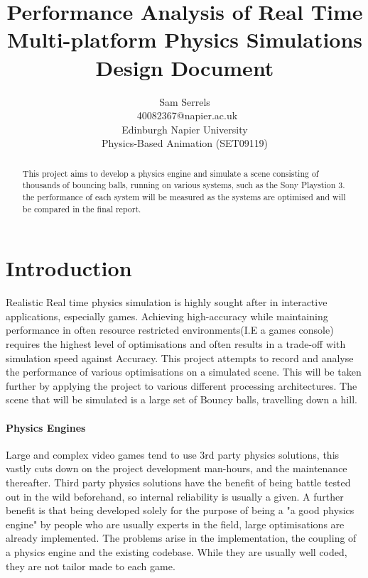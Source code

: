 \documentclass[conference]{acmsiggraph}
\title{Performance Analysis of Real Time Multi-platform Physics Simulations \\
	   Design Document}
\author{Sam Serrels\\\ 40082367@napier.ac.uk \\
Edinburgh Napier University\\
Physics-Based Animation (SET09119)}
\begin{document}

\maketitle

\begin{abstract}
This project aims to develop a physics engine and simulate a scene consisting of thousands of bouncing balls, running on various systems, such as the Sony Playstion 3.
the performance of each system will be measured as the systems are optimised and will be compared in the final report.
\end{abstract}

\keywordlist

\section{Introduction}

Realistic Real time physics simulation is highly sought after in interactive applications, especially games. Achieving high-accuracy while maintaining performance in often resource restricted environments(I.E a games console) requires the highest level of optimisations and often results in a trade-off with simulation speed against Accuracy. This project attempts to record and analyse the performance of various optimisations on a simulated scene. This will be taken further by applying the project to various different processing architectures. The scene that will be simulated is a large set of Bouncy balls, travelling down a hill.

\paragraph{Physics Engines}
Large and complex video games tend to use 3rd party physics solutions, this vastly cuts down on the project development man-hours, and the maintenance thereafter. Third party physics solutions have the benefit of being battle tested out in the wild beforehand, so internal reliability is usually a given. A further benefit is that being developed solely for the purpose of being a "a good physics engine" by people who are usually experts in the field, large optimisations are already implemented. The problems arise in the implementation, the coupling of a physics engine and the existing codebase. While they are usually well coded, they are not tailor made to each game. 
\end{document}

